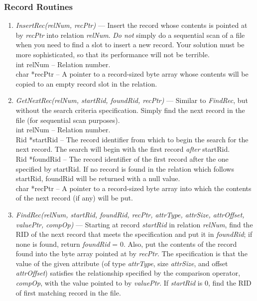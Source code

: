 \subsubsection{Record Routines}
\begin{enumerate}
\item
\emph{InsertRec(relNum, recPtr)} --- Insert the record whose contents
is pointed at by \emph{recPtr} into relation \emph{relNum}.
\emph{Do not} simply do a sequential scan of a file when you need
to find a slot to insert a new record.  Your solution must be
more sophisticated, so that its performance will not be terrible.
\\
int relNum -- Relation number.
\\
char *recPtr -- A pointer to a record-sized byte array whose contents will
be copied to an empty record slot in the relation.
\item
\emph{GetNextRec(relNum, startRid, foundRid, recPtr)} --- Similar
to \emph{FindRec},
but without the search criteria specification.  Simply find the next record in
the file (for sequential scan purposes).
\\
int relNum -- Relation number.
\\
Rid *startRid -- The record identifier from which to begin the search for
the next record.  The search will begin with the first 
record \emph{after} startRid.
\\
Rid *foundRid -- The record identifier of
the first record after the one specified by startRid. 
If no record is found in the relation which follows 
startRid, foundRid will be returned with a null value.
\\
char *recPtr -- A pointer to a record-sized byte array into which the contents 
of the next record (if any) will be put.
\item
\emph{FindRec(relNum, startRid, foundRid, recPtr, attrType, attrSize,
attrOffset, valuePtr, compOp)} --- Starting at record \emph{startRid} 
in relation \emph{relNum}, find the RID of the next
record that meets the specification and put it in \emph{foundRid};
if none is found, return \emph{foundRid} = 0.  Also, put the
contents of the record found into the byte array pointed at by
\emph{recPtr}.  The specification is that the value of the given
attribute (of type \emph{attrType}, size \emph{attrSize}, and
offset \emph{attrOffset}) satisfies the relationship specified by
the comparison operator, \emph{compOp}, with the value pointed to
by \emph{valuePtr}.  If \emph{startRid} is 0, find the RID of
first matching record in the file.
\\

\end{enumerate}
